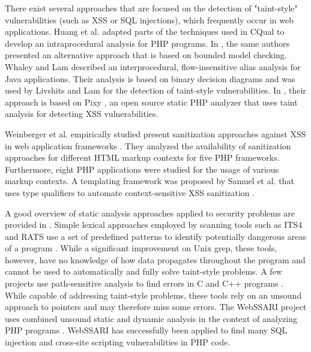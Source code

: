 There exist several approaches that are focused on the detection of "taint-style" vulnerabilities (such as XSS or SQL injections), which
frequently occur in web applications. Huang et al. \cite{ref_75_huang2004securing}
adapted parts of the techniques used in CQual to develop
an intraprocedural analysis for PHP programs. In \cite{ref_76_huang2004verifying}, the
same authors presented an alternative approach that is based
on bounded model checking. Whaley and Lam \cite{ref_77_whaley2004cloning} described an interprocedural, flow-insensitive alias analysis for Java applications. Their analysis is based on binary decision diagrams and was used by Livshits and Lam \cite{ref_78_livshits2005finding} for the detection of taint-style vulnerabilities. In \cite{ref_62_balzarotti2008saner}, their approach is based on Pixy \cite{ref_79_jovanovic2010static,ref_80_jovanovic2006precise}, an open
source static PHP analyzer that uses taint analysis for detecting XSS vulnerabilities.

Weinberger et al. empirically studied present sanitization
approaches against XSS in web application frameworks \cite{ref_105_weinberger2011systematic}.
They analyzed the availability of sanitization approaches for
different HTML markup contexts for five PHP frameworks.
Furthermore, eight PHP applications were studied for the
usage of various markup contexts. A templating framework
was proposed by Samuel et al. that uses type qualifiers
to automate context-sensitive XSS sanitization \cite{ref_106_samuel2011context}.

A good overview of static analysis approaches applied to security problems are provided in  \cite{ref_81_chess2004static}. Simple lexical approaches employed by scanning tools such as ITS4 and RATS use a set of predefined patterns to identify potentially dangerous areas of a program \cite{ref_82_wilander2002comparison}. While a significant improvement on Unix grep, these tools, however, have no knowledge of how data propagates throughout the program and cannot be used to automatically and fully solve taint-style problems.
A few projects use path-sensitive analysis to find errors in C and C++ programs \cite{ref_83_bush2000static,ref_84_hallem2002system,ref_85_livshits2003tracking}. While capable of addressing taint-style problems, these tools rely on an unsound approach to pointers and may therefore miss some errors. The WebSSARI project uses combined unsound static and dynamic analysis in the context of analyzing PHP programs \cite{ref_75_huang2004securing}. WebSSARI has successfully been applied to find many SQL injection and cross-site scripting vulnerabilities in PHP code.

